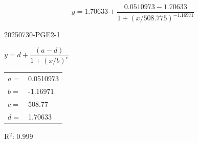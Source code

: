 \documentclass[UTF8,10pt,a4paper,fontset=fandol]{ctexart}
\newcommand{\fieldvalue}[1]{#1}
\begin{document}
\[
y=1.70633+
\frac{0.0510973-1.70633}
 {1+\left(x/508.775\right)^{-1.16971}}
\]

\newpage

\noindent
\fieldvalue{20250730-PGE2-1}

\medskip

\noindent
$y=d+\dfrac{(a-d)}{1+(x/b)^c}$

\noindent
\begin{tabular}{ll}
$a={}$&
\fieldvalue{0.0510973}\\
$b={}$&
\fieldvalue{-1.16971}\\
$c={}$&
\fieldvalue{508.77}\\
$d={}$&
\fieldvalue{1.70633}
\end{tabular}

\medskip

R$^2$:
\fieldvalue{0.999}

\medskip
\end{document}
